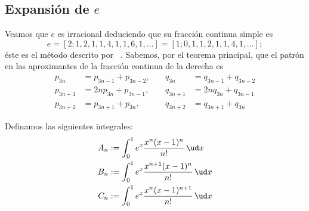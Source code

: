 \documentclass[teoria-numeros.tex]{subfiles}
\begin{document}
\subsection*{Expansión de $e$}
Veamos que $e$ es irracional deduciendo que su fracción continua simple es
$$ e = [2; 1, 2, 1, 1, 4, 1, 1, 6, 1, \dots] = [1; 0, 1, 1, 2, 1, 1, 4, 1, \dots]; $$
éste es el método descrito por \citeauthor{cohn:expansion_of_e}~\cite{cohn:expansion_of_e}.
Sabemos, por el teorema principal, que el patrón en las aproximantes de la fracción continua de la derecha es
\begin{align*}
	p_{3n}   &= p_{3n-1} + p_{3n-2}, &\quad q_{3n}   &= q_{3n-1} + q_{3n-2} \\
	p_{3n+1} &= 2np_{3n} + p_{3n-1}, &\quad q_{3n+1} &= 2nq_{3n} + q_{3n-1} \\
	p_{3n+2} &= p_{3n+1} + p_{3n},   &\quad q_{3n+2} &= q_{3n+1} + q_{3n}
\end{align*}

Definamos las siguientes integrales:
\begin{align*}
	A_n &:= \int_0^1 e^x \frac{x^n (x - 1)^n}{n!} \, \ud x \\
	B_n &:= \int_0^1 e^x \frac{x^{n+1} (x - 1)^n}{n!} \, \ud x \\
	C_n &:= \int_0^1 e^x \frac{x^n (x - 1)^{n+1}}{n!} \, \ud x
\end{align*}
\end{document}
